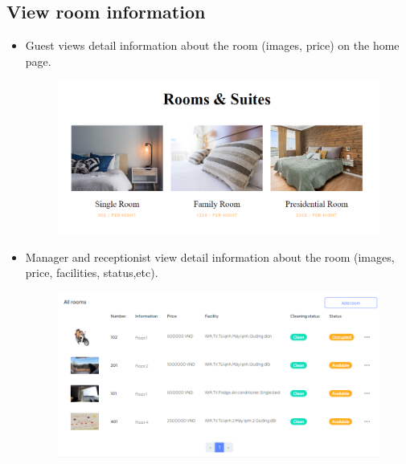     \subsection{View room information}
    \begin{itemize}
        \item Guest views detail information about the room (images, price) on the home page.
        \begin{figure}[H]
            \includegraphics[width=1\linewidth]{img/viewroomin4.png}
            \label{fig:viewroominfor}
        \end{figure}
        \item Manager and receptionist view detail information about the room (images, price, facilities, status,etc).
        \begin{figure}[H]
            \includegraphics[width=1\linewidth]{img/viewroom_admin.png}
            \label{fig:viewroominfor_admin}
        \end{figure}
    \end{itemize}
